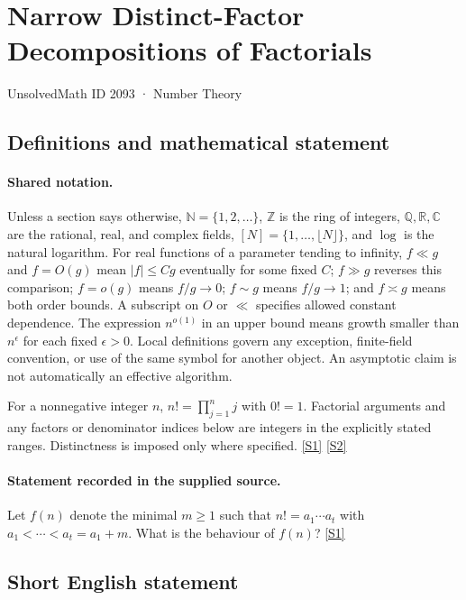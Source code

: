 \documentclass[11pt,a4paper]{article}
\newcommand{\N}{\mathbb{N}}
\newcommand{\Z}{\mathbb{Z}}
\newcommand{\Q}{\mathbb{Q}}
\newcommand{\R}{\mathbb{R}}
\newcommand{\C}{\mathbb{C}}
\newcommand{\sref}[2]{\hyperlink{source:#1:#2}{[S#2]}}
\begin{document}

\setcounter{section}{2092}

\section{Narrow Distinct-Factor Decompositions of Factorials}\label{2093}

{\small\sffamily UnsolvedMath ID 2093 · Number Theory}

\subsection{Definitions and mathematical statement}

\paragraph{Shared notation.}Unless a section says otherwise, $\N=\{1,2,\ldots\}$,
$\Z$ is the ring of integers, $\Q,\R,\C$ are the rational, real, and complex
fields, $[N]=\{1,\ldots,\lfloor N\rfloor\}$, and $\log$ is the natural
logarithm. For real functions of a parameter tending to infinity,
$f\ll g$ and $f=O(g)$ mean $|f|\leq Cg$ eventually for some fixed $C$;
$f\gg g$ reverses this comparison; $f=o(g)$ means $f/g\to0$;
$f\sim g$ means $f/g\to1$; and $f\asymp g$ means both order bounds.
A subscript on $O$ or $\ll$ specifies allowed constant dependence.
The expression $n^{o(1)}$ in an upper bound means growth smaller than
$n^\epsilon$ for each fixed $\epsilon>0$. Local definitions govern any
exception, finite-field convention, or use of the same symbol for another
object. An asymptotic claim is not automatically an effective algorithm.



For a nonnegative integer $n$, $n!=\prod_{j=1}^n j$ with $0!=1$. Factorial arguments and any factors or denominator indices below are integers in the explicitly stated ranges. Distinctness is imposed only where specified. \sref{2093}{1} \sref{2093}{2}

\paragraph{Statement recorded in the supplied source.}
Let $f(n)$ denote the minimal $m\geq 1$ such that $ n! = a_1\cdots a_t $ with $a_1<\cdots <a_t=a_1+m$. What is the behaviour of $f(n)$? \sref{2093}{1}

\subsection{Short English statement}
\end{document}
